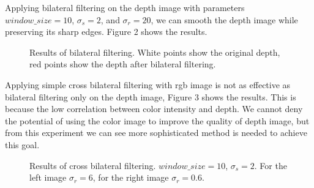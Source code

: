 \documentclass{article}
\begin{document}
Applying bilateral filtering on the depth image with parameters $window\_size=10$, $\sigma_s=2$, and $\sigma_r=20$, we can smooth the depth image while preserving its sharp edges. Figure 2 shows the results.

\begin{figure}[ht]%
\centering
{}%
\qquad
{}%
\caption{Results of bilateral filtering. White points show the original depth, red points show the depth after bilateral filtering.}%
\label{fig2}%
\end{figure}

Applying simple cross bilateral filtering with rgb image is not as effective as bilateral filtering only on the depth image, Figure 3 shows the results. This is because the low correlation between color intensity and depth. We cannot deny the potential of using the color image to improve the quality of depth image, but from this experiment we can see more sophisticated method is needed to achieve this goal.

\begin{figure}[!t]%
\centering
{}%
\qquad
{}%
\caption{Results of cross bilateral filtering. $window\_size=10$, $\sigma_s=2$. For the left image $\sigma_r=6$, for the right image $\sigma_r=0.6$.}%
\label{fig3}%
\end{figure}
\end{document}
